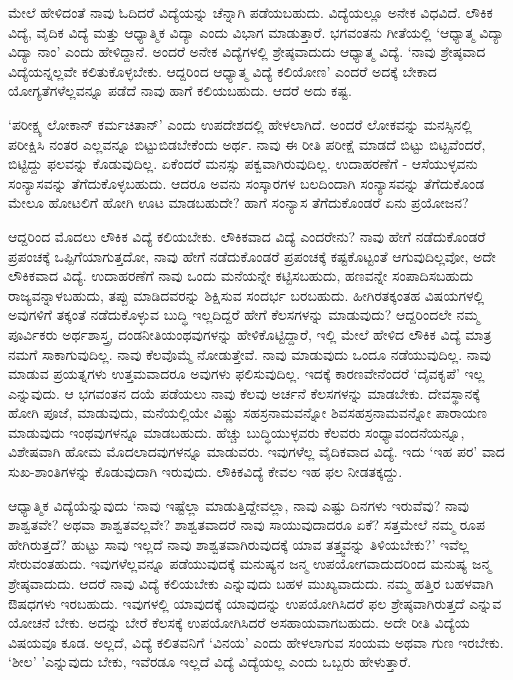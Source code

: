 ಮೇಲೆ ಹೇಳಿದಂತೆ ನಾವು ಓದಿದರೆ 
ವಿದ್ಯೆಯನ್ನು ಚೆನ್ನಾಗಿ 
ಪಡೆಯಬಹುದು. ವಿದ್ಯೆಯಲ್ಲೂ 
ಅನೇಕ ವಿಧವಿದೆ. ಲೌಕಿಕ ವಿದ್ಯೆ, 
ವೈದಿಕ ವಿದ್ಯೆ ಮತ್ತು 
ಆಧ್ಯಾತ್ಮಿಕ ವಿದ್ಯಾ  ಎಂದು 
ವಿಭಾಗ ಮಾಡುತ್ತಾರೆ. ಭಗವಂತನು 
ಗೀತೆಯಲ್ಲಿ `ಆಧ್ಯಾತ್ಮ 
ವಿದ್ಯಾ ವಿದ್ಯಾ ನಾಂ' ಎಂದು 
ಹೇಳಿದ್ದಾನೆ. ಅಂದರೆ ಅನೇಕ 
ವಿದ್ಯೆಗಳಲ್ಲಿ 
ಶ್ರೇಷ್ಠವಾದುದು ಆಧ್ಯಾತ್ಮ 
ವಿದ್ಯೆ. `ನಾವು ಶ್ರೇಷ್ಠವಾದ 
ವಿದ್ಯೆಯನ್ನಲ್ಲವೇ 
ಕಲಿತುಕೊಳ್ಳಬೇಕು. ಆದ್ದರಿಂದ 
ಆಧ್ಯಾತ್ಮ ವಿದ್ಯೆ ಕಲಿಯೋಣ' 
ಎಂದರೆ ಅದಕ್ಕೆ ಬೇಕಾದ 
ಯೋಗ್ಯತೆಗಳೆಲ್ಲವನ್ನೂ ಪಡೆದೆ ನಾವು ಹಾಗೆ ಕಲಿಯಬಹುದು. ಆದರೆ ಅದು ಕಷ್ಟ.

`ಪರೀಕ್ಷ್ಯ ಲೋಕಾನ್ 
ಕರ್ಮಚಿತಾನ್' ಎಂದು 
ಉಪದೇಶದಲ್ಲಿ ಹೇಳಲಾಗಿದೆ. 
ಅಂದರೆ ಲೋಕವನ್ನು 
ಮನಸ್ಸಿನಲ್ಲಿ ಪರೀಕ್ಷಿಸಿ 
ನಂತರ ಎಲ್ಲವನ್ನೂ 
ಬಿಟ್ಟುಬಿಡಬೇಕೆಂದು ಅರ್ಥ. 
ನಾವು ಈ ರೀತಿ ಪರೀಕ್ಷೆ ಮಾಡದೆ 
ಬಿಟ್ಟು ಬಿಟ್ಟವೆಂದರೆ, 
ಬಿಟ್ಟಿದ್ದು ಫಲವನ್ನು 
ಕೊಡುವುದಿಲ್ಲ. ಏಕೆಂದರೆ 
ಮನಸ್ಸು ಪಕ್ವವಾಗಿರುವುದಿಲ್ಲ. 
ಉದಾಹರಣೆಗೆ - ಆಸೆಯುಳ್ಳವನು 
ಸಂನ್ಯಾಸವನ್ನು 
ತೆಗೆದುಕೊಳ್ಳಬಹುದು. ಆದರೂ 
ಅವನು ಸಂಸ್ಕಾರಗಳ ಬಲದಿಂದಾಗಿ 
ಸಂನ್ಯಾಸವನ್ನು ತೆಗೆದುಕೊಂಡ 
ಮೇಲೂ ಹೋಟಲಿಗೆ ಹೋಗಿ ಊಟ ಮಾಡಬಹುದೇ? ಹಾಗೆ ಸಂನ್ಯಾಸ ತೆಗೆದುಕೊಂಡರೆ ಏನು ಪ್ರಯೋಜನ?

ಆದ್ದರಿಂದ ಮೊದಲು ಲೌಕಿಕ 
ವಿದ್ಯೆ ಕಲಿಯಬೇಕು. ಲೌಕಿಕವಾದ 
ವಿದ್ಯೆ ಎಂದರೇನು? ನಾವು ಹೇಗೆ 
ನಡೆದುಕೊಂಡರೆ ಪ್ರಪಂಚಕ್ಕೆ 
ಒಪ್ಪಿಗೆಯಾಗುತ್ತದೋ, ನಾವು 
ಹೇಗೆ ನಡೆದುಕೊಂಡರೆ 
ಪ್ರಪಂಚಕ್ಕೆ ಕಷ್ಟಕೊಟ್ಟಂತೆ 
ಆಗುವುದಿಲ್ಲವೋ, ಅದೇ 
ಲೌಕಿಕವಾದ ವಿದ್ಯೆ. 
ಉದಾಹರಣೆಗೆ ನಾವು ಒಂದು 
ಮನೆಯನ್ನೇ ಕಟ್ಟಿಸಬಹುದು, 
ಹಣವನ್ನೇ ಸಂಪಾದಿಸಬಹುದು 
ರಾಜ್ಯವನ್ನಾಳಬಹುದು, ತಪ್ಪು 
ಮಾಡಿದವರನ್ನು ಶಿಕ್ಷಿಸುವ 
ಸಂದರ್ಭ ಬರಬಹುದು. 
ಹೀಗಿರತಕ್ಕಂತಹ ವಿಷಯಗಳಲ್ಲಿ 
ಅವುಗಳಿಗೆ ತಕ್ಕಂತೆ 
ನಡೆದುಕೊಳ್ಳುವ ಬುದ್ಧಿ 
ಇಲ್ಲದಿದ್ದರೆ ಹೇಗೆ 
ಕೆಲಸಗಳನ್ನು ಮಾಡುವುದು? 
ಆದ್ದರಿಂದಲೇ ನಮ್ಮ ಪೂರ್ವಿಕರು 
ಅರ್ಥಶಾಸ್ತ್ರ, 
ದಂಡನೀತಿಯಂಥವುಗಳನ್ನು 
ಹೇಳಿಕೊಟ್ಟಿದ್ದಾರೆ, ಇಲ್ಲಿ 
ಮೇಲೆ ಹೇಳಿದ ಲೌಕಿಕ ವಿದ್ಯೆ 
ಮಾತ್ರ ನಮಗೆ ಸಾಕಾಗುವುದಿಲ್ಲ. 
ನಾವು ಕೆಲವೊಮ್ಮೆ 
ನೋಡುತ್ತೇವೆ. ನಾವು ಮಾಡುವುದು 
ಒಂದೂ ನಡೆಯುವುದಿಲ್ಲ. ನಾವು 
ಮಾಡುವ ಪ್ರಯತ್ನಗಳು 
ಉತ್ತಮವಾದರೂ ಅವುಗಳು 
ಫಲಿಸುವುದಿಲ್ಲ. ಇದಕ್ಕೆ 
ಕಾರಣವೇನೆಂದರೆ `ದೈವಕೃಪೆ' 
ಇಲ್ಲ ಎನ್ನುವುದು. ಆ ಭಗವಂತನ 
ದಯೆ ಪಡೆಯಲು ನಾವು ಕೆಲವು 
ಅರ್ಚನೆ ಕೆಲಸಗಳನ್ನು 
ಮಾಡಬೇಕು. ದೇವಸ್ಥಾನಕ್ಕೆ 
ಹೋಗಿ ಪೂಜೆ, ಮಾಡುವುದು, 
ಮನೆಯಲ್ಲಿಯೇ ವಿಷ್ಣು 
ಸಹಸ್ರನಾಮವನ್ನೋ 
ಶಿವಸಹಸ್ರನಾಮವನ್ನೋ ಪಾರಾಯಣ 
ಮಾಡುವುದು ಇಂಥವುಗಳನ್ನೂ 
ಮಾಡಬಹುದು. ಹೆಚ್ಚು 
ಬುದ್ಧಿಯುಳ್ಳವರು ಕೆಲವರು 
ಸಂಧ್ಯಾವಂದನೆಯನ್ನೂ, 
ವಿಶೇಷವಾಗಿ ಹೋಮ 
ಮೊದಲಾದವುಗಳನ್ನೂ ಮಾಡುವರು. 
ಇವುಗಳೆಲ್ಲ ವೈದಿಕವಾದ 
ವಿದ್ಯೆ. ಇದು `ಇಹ ಪರ' ವಾದ 
ಸುಖ-ಶಾಂತಿಗಳನ್ನು 
ಕೊಡುವುದಾಗಿ ಇರುವುದು. ಲೌಕಿಕವಿದ್ಯೆ ಕೇವಲ ಇಹ ಫಲ ನೀಡತಕ್ಕದ್ದು.

ಆಧ್ಯಾತ್ಮಿಕ 
ವಿದ್ಯೆಯೆನ್ನುವುದು `ನಾವು 
ಇಷ್ಟೆಲ್ಲಾ 
ಮಾಡುತ್ತಿದ್ದೇವಲ್ಲಾ, ನಾವು 
ಎಷ್ಟು ದಿನಗಳು ಇರುವೆವು? ನಾವು 
ಶಾಶ್ವತವೇ? ಅಥವಾ 
ಶಾಶ್ವತವಲ್ಲವೇ? ಶಾಶ್ವತವಾದರೆ 
ನಾವು ಸಾಯುವುದಾದರೂ ಏಕೆ? 
ಸತ್ತಮೇಲೆ ನಮ್ಮ ರೂಪ 
ಹೇಗಿರುತ್ತದೆ? ಹುಟ್ಟು ಸಾವು 
ಇಲ್ಲದೆ ನಾವು 
ಶಾಶ್ವತವಾಗಿರುವುದಕ್ಕೆ ಯಾವ 
ತತ್ತ್ವವನ್ನು ತಿಳಿಯಬೇಕು?' 
ಇವೆಲ್ಲ ಸೇರುವಂತಹುದು. 
ಇವುಗಳೆಲ್ಲವನ್ನೂ 
ಪಡೆಯುವುದಕ್ಕೆ ಮನುಷ್ಯನ ಜನ್ಮ 
ಉಪಯೋಗವಾದುದರಿಂದ ಮನುಷ್ಯ 
ಜನ್ಮ ಶ್ರೇಷ್ಠವಾದುದು. ಆದರೆ 
ನಾವು ವಿದ್ಯೆ ಕಲಿಯಬೇಕು 
ಎನ್ನುವುದು ಬಹಳ 
ಮುಖ್ಯವಾದುದು. ನಮ್ಮ ಹತ್ತಿರ 
ಬಹಳವಾಗಿ ಔಷಧಗಳು ಇರಬಹುದು. 
ಇವುಗಳಲ್ಲಿ ಯಾವುದಕ್ಕೆ 
ಯಾವುದನ್ನು ಉಪಯೋಗಿಸಿದರೆ ಫಲ 
ಶ್ರೇಷ್ಠವಾಗಿರುತ್ತದೆ 
ಎನ್ನುವ ಯೋಚನೆ ಬೇಕು. ಅದನ್ನು 
ಬೇರೆ ಕೆಲಸಕ್ಕೆ ಉಪಯೋಗಿಸಿದರೆ 
ಅಸಹಾಯವಾಗಬಹುದು. ಅದೇ ರೀತಿ 
ವಿದ್ಯೆಯ ವಿಷಯವೂ ಕೂಡ. ಅಲ್ಲದೆ, 
ವಿದ್ಯೆ ಕಲಿತವನಿಗೆ `ವಿನಯ' 
ಎಂದು ಹೇಳಲಾಗುವ ಸಂಯಮ ಅಥವಾ 
ಗುಣ ಇರಬೇಕು. `ಶೀಲ' 'ಎನ್ನುವುದು 
ಬೇಕು, ಇವೆರಡೂ ಇಲ್ಲದೆ ವಿದ್ಯೆ ವಿದ್ಯೆಯಲ್ಲ ಎಂದು ಒಬ್ಬರು ಹೇಳುತ್ತಾರೆ.

